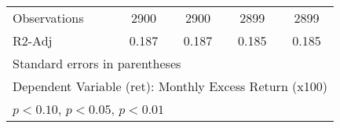 \begin{table}[htbp]
\begin{tabular}{l*{4}{c}}
Observations        &        2900         &        2900         &        2899         &        2899         \\
R2-Adj              &       0.187         &       0.187         &       0.185         &       0.185         \\
\hline\hline
\multicolumn{5}{l}{\footnotesize Standard errors in parentheses}\\
\multicolumn{5}{l}{\footnotesize Dependent Variable (ret): Monthly Excess Return (x100)}\\
\multicolumn{5}{l}{\footnotesize \sym{*} \(p<0.10\), \sym{**} \(p<0.05\), \sym{***} \(p<0.01\)}\\
\end{tabular}
\end{table}
